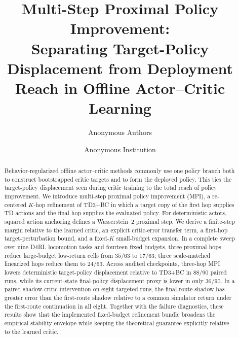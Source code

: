 \documentclass[10pt,twocolumn,twoside]{article}
\title{Multi-Step Proximal Policy Improvement:\\Separating Target-Policy Displacement from Deployment Reach in Offline Actor--Critic Learning}
\author{Anonymous Authors}
\date{Anonymous Institution}
\begin{document}
\maketitle

\begin{abstract}
Behavior-regularized offline actor--critic methods commonly use one policy branch both to construct bootstrapped critic targets and to form the deployed policy. This ties the target-policy displacement seen during critic training to the total reach of policy improvement. We introduce multi-step proximal policy improvement (MPI), a re-centered $K$-hop refinement of TD3+BC in which a target copy of the first hop supplies TD actions and the final hop supplies the evaluated policy. For deterministic actors, squared action anchoring defines a Wasserstein--2 proximal step. We derive a finite-step margin relative to the learned critic, an explicit critic-error transfer term, a first-hop target-perturbation bound, and a fixed-$K$ small-budget expansion. In a complete sweep over nine D4RL locomotion tasks and fourteen fixed budgets, three proximal hops reduce large-budget low-return cells from $35/63$ to $17/63$; three scale-matched linearized hops reduce them to $24/63$. Across audited checkpoints, three-hop MPI lowers deterministic target-policy displacement relative to TD3+BC in $88/90$ paired runs, while its current-state final-policy displacement proxy is lower in only $36/90$. In a paired shadow-critic intervention on eight targeted runs, the final-route shadow has greater error than the first-route shadow relative to a common simulator return under the first-route continuation in all eight. Together with the failure diagnostics, these results show that the implemented fixed-budget refinement bundle broadens the empirical stability envelope while keeping the theoretical guarantee explicitly relative to the learned critic.
\end{abstract}











\end{document}
